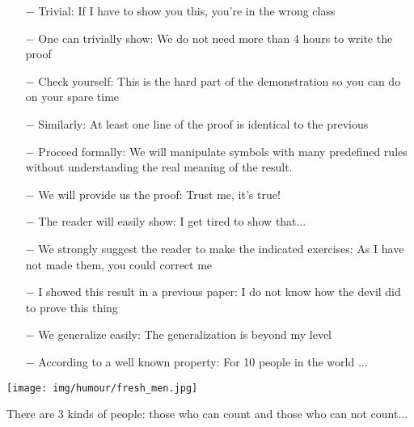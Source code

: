 \begin{itemize}	 
	\item[$-$] Trivial: If I have to show you this, you're in the wrong class

	\item[$-$] One can trivially show: We do not need more than 4 hours to write the proof

	\item[$-$] Check yourself: This is the hard part of the demonstration so you can do on your spare time

	\item[$-$] Similarly: At least one line of the proof is identical to the previous

	\item[$-$] Proceed formally: We will manipulate symbols with many predefined rules without understanding the real meaning of the result.

	\item[$-$] We will provide us the proof: Trust me, it's true!

	\item[$-$] The reader will easily show: I get tired to show that...

	\item[$-$] We strongly suggest the reader to make the indicated exercises: As I have not made them, you could correct me

	\item[$-$] I showed this result in a previous paper: I do not know how the devil did to prove this thing

	\item[$-$] We generalize easily: The generalization is beyond my level

	\item[$-$] According to a well known property: For 10 people in the world ...
\end{itemize}
\begin{center}\underline{\hspace{5 cm}}\end{center}
	
	\begin{center}
		\texttt{[image: img/humour/fresh\_men.jpg]}	
	\end{center}
	
	\begin{center}\underline{\hspace{5 cm}}\end{center}	

There are 3 kinds of people: those who can count and those who can not count...
	\begin{center}\underline{\hspace{5 cm}}\end{center}	
	
